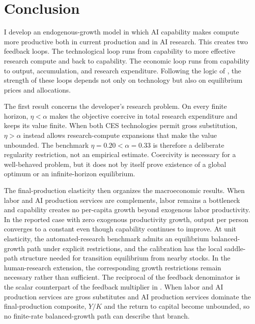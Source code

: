 \section{Conclusion}

I develop an endogenous-growth model in which AI capability makes compute more
productive both in current production and in AI research. This creates two
feedback loops. The technological loop runs from capability to more effective
research compute and back to capability. The economic loop runs from capability
to output, accumulation, and research expenditure. Following the logic of
\citet{davidsonetal2026}, the strength of these loops depends not only on
technology but also on equilibrium prices and allocations.

The first result concerns the developer's research problem. On every finite
horizon, \(\eta<\alpha\) makes the objective coercive in total research
expenditure and keeps its value finite. When both CES technologies permit gross
substitution, \(\eta>\alpha\) instead allows research-compute expansions that
make the value unbounded. The benchmark \(\eta=0.20<\alpha=0.33\) is therefore a
deliberate regularity restriction, not an empirical estimate. Coercivity is
necessary for a well-behaved problem, but it does not by itself prove existence
of a global optimum or an infinite-horizon equilibrium.

The final-production elasticity then organizes the macroeconomic results. When
labor and AI production services are complements, labor remains a bottleneck and
capability creates no per-capita growth beyond exogenous labor productivity. In
the reported case with zero exogenous productivity growth, output per person
converges to a constant even though capability continues to improve. At unit
elasticity, the automated-research benchmark admits an equilibrium
balanced-growth path under explicit restrictions, and the calibration has the
local saddle-path structure needed for transition equilibrium from nearby
stocks. In the human-research extension, the corresponding growth restrictions
remain necessary rather than sufficient. The reciprocal of the feedback
denominator is the scalar counterpart of the feedback multiplier in
\citet{davidsonetal2026}. When labor and AI production services
are gross substitutes and AI production services dominate the final-production composite,
\(Y/K\) and the return to capital become unbounded, so no finite-rate
balanced-growth path can describe that branch.

